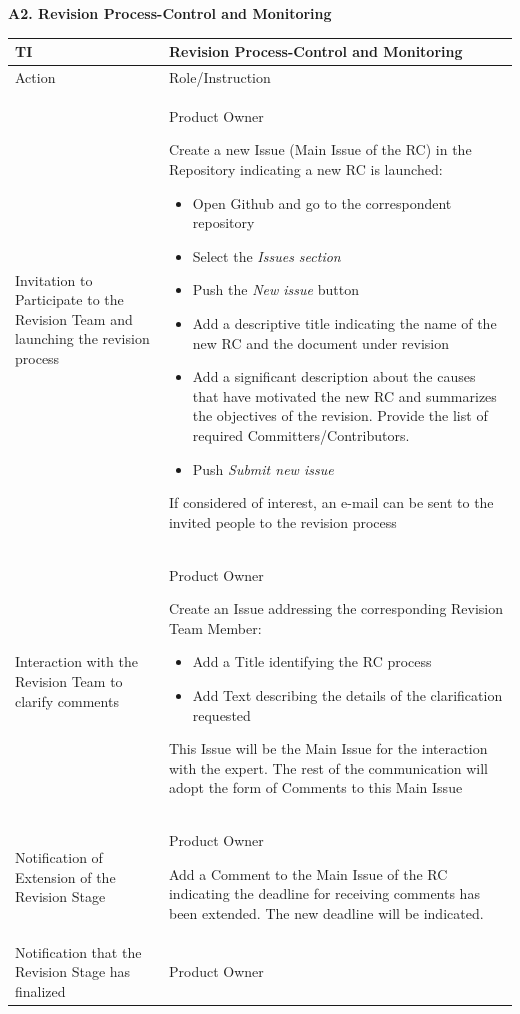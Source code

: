 \documentclass{template/openetcs_article}
\begin{document}
\textbf{A2. Revision Process-Control and Monitoring}

\begin{flushleft}
\tablefirsthead{}
\tablehead{}
\tabletail{}
\tablelasttail{}
\begin{supertabular}{|m{3cm}|m{12cm}|}
\hline
{}
TI & 
Revision Process-Control and Monitoring
\\\hline
{}
Action &
Role/Instruction
\\\hline
Invitation to Participate to the Revision Team and launching the revision process &
Product Owner

Create a new Issue (Main Issue of the RC) in the Repository indicating a new RC is launched:
\begin{itemize}
\item Open Github and go to the correspondent repository
\item Select the {\it Issues section}
\item Push the {\it New issue} button
\item Add a descriptive title indicating the name of the new RC and the document under revision
\item Add a significant description about the causes that have motivated the new RC and summarizes the objectives of the revision. Provide the list of required Committers/Contributors.
\item Push {\it Submit new issue} 
\end{itemize}
If considered of interest, an e-mail can be sent to the invited people to the revision process
\\\hline
Interaction with the Revision Team to clarify comments &
Product Owner

Create an Issue addressing the corresponding Revision Team Member:
\begin{itemize}
\item Add a Title identifying the RC process
\item Add Text describing the details of the clarification requested
\end{itemize}
This Issue will be the Main Issue for the interaction with the expert. The rest of the communication will adopt the form of Comments to this Main Issue
\\\hline
Notification of Extension of the Revision Stage &
Product Owner

Add a Comment to the Main Issue of the RC indicating the deadline for receiving comments has been extended. The new deadline will be indicated.
\\\hline
Notification that the Revision Stage has finalized &
Product Owner


\end{supertabular}
\end{flushleft}
\end{document}

